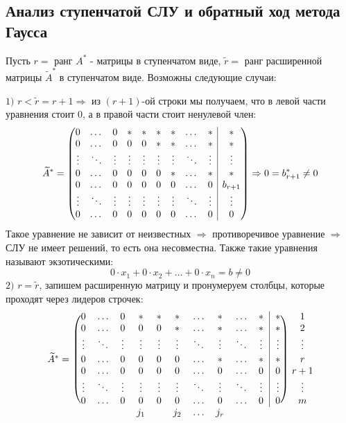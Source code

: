 \documentclass[12pt]{article}
\theoremstyle{definition}
\newcommand{\wte}[1]{\widetilde{#1}}
\begin{document}
\subsection*{Анализ ступенчатой СЛУ и обратный ход метода Гаусса}
Пусть $r =$ ранг $A^*$ - матрицы в ступенчатом виде, $\wte{r} = $ ранг расширенной матрицы $\wte{A}^{*}$ в ступенчатом виде. Возможны следующие случаи:

$1)$ $r < \wte{r} = r + 1\Rightarrow$ из $(r + 1)$-ой строки мы получаем, что в левой части уравнения стоит $0$, а в правой части стоит ненулевой член: 
$$
	\wte{A}^{*} =  
	\begin{pmatrix} 
		0 & \dotsc & 0 & * & * & * & * & \dotsc & \multicolumn{1}{c|}{*} &* \\ 
		0 & \dotsc & 0 & 0 & 0 & * & * &\dotsc & \multicolumn{1}{c|}{*} & *\\  
		\vdots & \ddots & \vdots & \vdots & \vdots & \vdots & \vdots & \ddots & \multicolumn{1}{c|}{\vdots} &\vdots \\ 
		0 & \dotsc & 0 & 0 & 0 & 0 & * & \dotsc & \multicolumn{1}{c|}{*} & *\\ 
		0 & \dotsc & 0 & 0 & 0 & 0 & 0 & \dotsc & \multicolumn{1}{c|}{0} & b_{r+1}\\  
		\vdots & \ddots & \vdots & \vdots & \vdots & \vdots & \vdots & \ddots & \multicolumn{1}{c|}{\vdots} & \vdots\\  
		0 & \dotsc & 0 & 0 & 0 & 0 & 0 & \dotsc & \multicolumn{1}{c|}{0} & 0\\  
	\end{pmatrix} \Rightarrow 0 = b^{*}_{r+1} \neq 0
$$
Такое уравнение не зависит от неизвестных $\Rightarrow$ противоречивое уравнение $\Rightarrow$ СЛУ не имеет решений, то есть она несовместна. Также такие уравнения называют экзотическими:
$$
	0{\cdot}x_1 + 0{\cdot}x_2 + \dotsc + 0{\cdot}x_n = b \neq 0
$$
$2)$ $r = \wte{r}$, запишем расширенную матрицу и пронумеруем столбцы, которые проходят через лидеров строчек:
$$
	\begin{blockarray}{ccccccccccccc}
		\begin{block}{c(cccccccccc|c)c}			
			& 0 & \dotsc & 0 & * & * & * & \dotsc & * & \dotsc & * &* & 1\\ 
			& 0 & \dotsc & 0 & 0 & 0 & * & \dotsc &* &\dotsc & * & * & 2\\  
			& \vdots & \ddots & \vdots & \vdots & \vdots & \vdots & \ddots & \vdots & \ddots & \vdots &\vdots & \vdots\\ 
			\wte{A}^{*} =  & 0 & \dotsc & 0 & 0 & 0 & 0 & \dotsc &  * & \dotsc & * & * & r\\ 
			&0 & \dotsc & 0 & 0 & 0 & 0 &\dotsc &  0 & \dotsc & 0 & 0 & r+1 \\  
			&\vdots & \ddots & \vdots & \vdots & \vdots & \vdots &\ddots & \vdots & \ddots & \vdots & \vdots & \vdots\\  
			&0 & \dotsc & 0 & 0 & 0 & 0 &\dotsc &  0 & \dotsc & 0 & 0 & m\\
		\end{block}
		 & &  &  & j_1 &  & j_2 &\dotsc &  j_r &  &  & & 
	\end{blockarray}
$$
\end{document}
